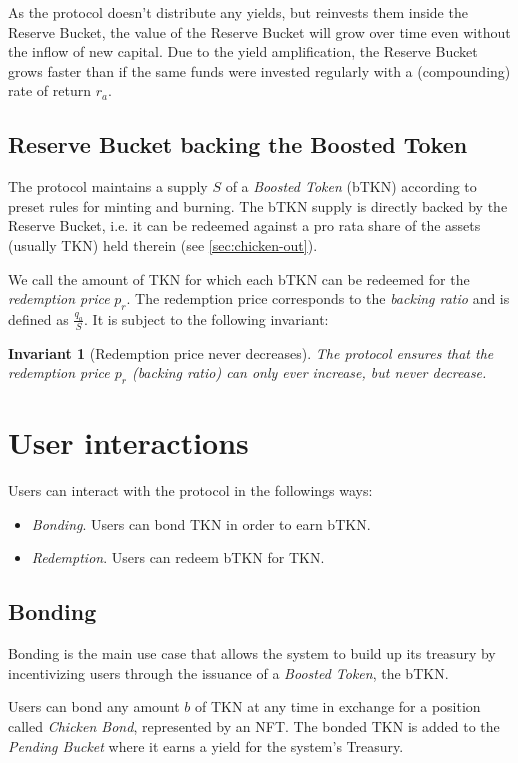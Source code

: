 \documentclass{article}
\newtheorem*{invariant}{Invariant}
\begin{document}
As the protocol doesn't distribute any yields, but reinvests them inside the Reserve Bucket, the value of the Reserve Bucket will grow over time even without the inflow of new capital. Due to the yield amplification, the Reserve Bucket grows faster than if the same funds were invested regularly with a (compounding) rate of return $r_a$.

\subsection{Reserve Bucket backing the Boosted Token}
The protocol maintains a supply $S$ of a \textit{Boosted Token} (bTKN) according to preset rules for minting and burning. The bTKN supply is directly backed by the Reserve Bucket, i.e. it can be redeemed against a pro rata share of the assets (usually TKN) held therein (see \ref{sec:chicken-out}).

We call the amount of TKN for which each bTKN can be redeemed for the \textit{redemption price} $p_r$. The redemption price  corresponds to the \textit{backing ratio} and is defined as $\frac{q_a}{S}$. It is subject to the following invariant:

\begin{invariant}[Redemption price never decreases]
The protocol ensures that the redemption price $p_r$ (backing ratio) can only ever increase, but never decrease.
\end{invariant}

\section{User interactions}

Users can interact with the protocol in the followings ways:
\begin{itemize}
    \item \textit{Bonding}. Users can bond TKN in order to earn bTKN.
    \item \textit{Redemption}. Users can redeem bTKN for TKN.
\end{itemize}

\subsection{Bonding}
Bonding is the main use case that allows the system to build up its treasury by incentivizing users through the issuance of a  \textit{Boosted Token}, the bTKN. 

Users can bond any amount $b$ of TKN at any time in exchange for a position called \textit{Chicken Bond}, represented by an NFT. The bonded TKN is added to the \textit{Pending Bucket} where it earns a yield for the system's Treasury.
\end{document}
